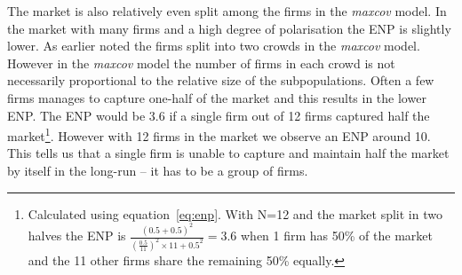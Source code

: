 \documentclass[preprint, 12pt]{elsarticle}
\begin{document}
The market is also relatively even split among the firms in the \emph{maxcov} model. In the market with many firms and a high degree of polarisation the ENP is slightly lower. As earlier noted the firms split into two crowds in the \emph{maxcov} model. However in the \emph{maxcov} model the number of firms in each crowd is not necessarily proportional to the relative size of the subpopulations. Often a few firms manages to capture one-half of the market and this results in the lower ENP. The ENP would be 3.6 if a single firm out of 12 firms captured half the market\footnote{Calculated using equation~\ref{eq:enp}. With N=12 and the market split in two halves the ENP is $\frac {(0.5+0.5)^2}{\left(\frac{0.5}{11}\right)^2 \times 11 + 0.5^2} = 3.6$ when 1 firm has 50\% of the market and the 11 other firms share the remaining 50\% equally.}. However with 12 firms in the market we observe an ENP around 10. This tells us that a single firm is unable to capture and maintain half the market by itself in the long-run -- it has to be a group of firms.
\end{document}
